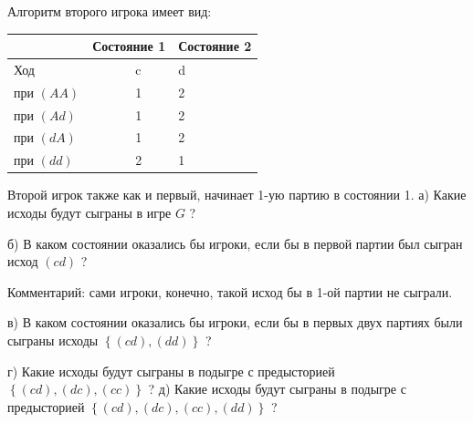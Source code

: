 {Алгоритм второго игрока имеет вид:


\begin{tabular} {|p{43.12pt}| p{19.60pt}| p{37.52pt}| p{19.60pt}| p{31.92pt}| } \hline
   &  \multicolumn{2}{|l|}{ Состояние 1 } &  \multicolumn{2}{|l|}{ Состояние 2 } \\ \hline
 \multicolumn{2}{|l|}{ Ход } &  \multicolumn{2}{|l|}{ c } &  d  \\ \hline
 \multicolumn{2}{|l|}{ при  $\left(AA\right)$  } &  \multicolumn{2}{|l|}{ 1 } &  2  \\ \hline
 \multicolumn{2}{|l|}{ при  $\left(Ad\right)$  } &  \multicolumn{2}{|l|}{ 1 } &  2  \\ \hline
 \multicolumn{2}{|l|}{ при  $\left(dA\right)$  } &  \multicolumn{2}{|l|}{ 1 } &  2  \\ \hline
 \multicolumn{2}{|l|}{ при  $\left(dd\right)$  } &  \multicolumn{2}{|l|}{ 2 } &  1  \\ \hline
\end{tabular}

Второй игрок также как и первый, начинает 1-ую партию в состоянии 1.
а) Какие исходы будут сыграны в игре  $G$ ?\par
б) В каком состоянии оказались бы игроки, если бы в первой партии был сыгран исход  $\left(cd\right)$ ?\par
Комментарий: сами игроки, конечно, такой исход бы в 1-ой партии не сыграли.\par
в) В каком состоянии оказались бы игроки, если бы в первых двух партиях были сыграны исходы  $\left\{\left(cd\right),\left(dd\right)\right\}$ ?\par
г) Какие исходы будут сыграны в подыгре с предысторией  $\left\{\left(cd\right),\left(dc\right),\left(cc\right)\right\}$ ?
д) Какие исходы будут сыграны в подыгре с предысторией  $\left\{\left(cd\right),\left(dc\right),\left(cc\right),\left(dd\right)\right\}$ ?
} \solution{} 

 \solution{} 

\solution{}

